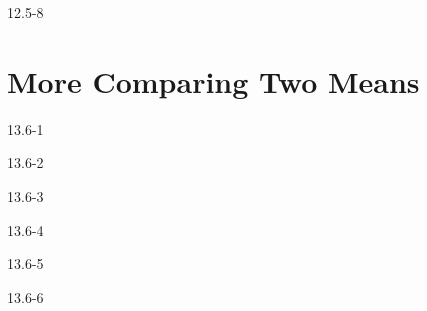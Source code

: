 \begin{exsol@solution}{12.5-8}

\end{exsol@solution}
\setcounter{chapter}{12}\chapter{More Comparing Two Means}
\begin{exsol@solution}{13.6-1}

\end{exsol@solution}
\begin{exsol@solution}{13.6-2}

\end{exsol@solution}
\begin{exsol@solution}{13.6-3}

\end{exsol@solution}
\begin{exsol@solution}{13.6-4}

\end{exsol@solution}
\begin{exsol@solution}{13.6-5}

\end{exsol@solution}
\begin{exsol@solution}{13.6-6}

\end{exsol@solution}
